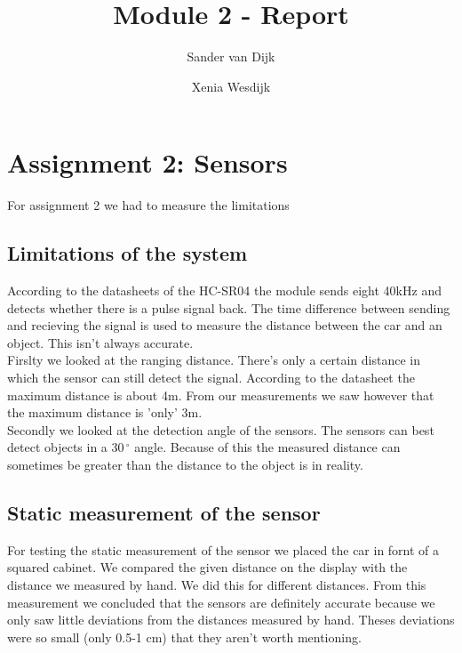 \documentclass[final]{scrreprt} %
\title{Module 2 - Report}
\author{Sander {van Dijk} \and Xenia {Wesdijk}}
\begin{document}
\chapter{Assignment 2: Sensors}

For assignment 2 we had to measure the limitations 

\section{Limitations of the system}
According to the datasheets of the HC-SR04 the module sends eight 40kHz and detects whether there is a pulse signal back. The time difference between sending and recieving the signal is used to measure the distance between the car and an object. This isn't always accurate.\\
Firslty we looked at the ranging distance. There's only a certain distance in which the sensor can still detect the signal. According to the datasheet the maximum distance is about 4m. From our measurements we saw however that the maximum distance is 'only' 3m.\\
Secondly we looked at the detection angle of the sensors. The sensors can best detect objects in a $30\,^{\circ}$ angle. Because of this the measured distance can sometimes be greater than the distance to the object is in reality.\\


\section{Static measurement of the sensor}
For testing the static measurement of the sensor we placed the car in fornt of a squared cabinet. We compared the given distance on the display with the distance we measured by hand. We did this for different distances. From this measurement we concluded that the sensors are definitely accurate because we only saw little deviations from the distances measured by hand. Theses deviations were so small (only 0.5-1 cm) that they aren't worth mentioning. 
\end{document}
